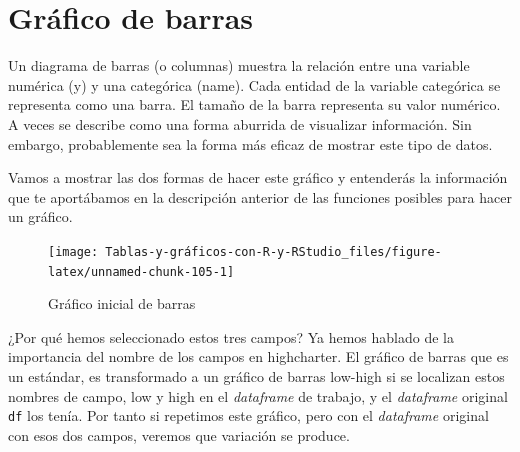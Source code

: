 \documentclass[
]{book}
\newenvironment{Shaded}{\begin{snugshade}}{\end{snugshade}}
\newcommand{\AttributeTok}[1]{\textcolor[rgb]{0.77,0.63,0.00}{#1}}
\newcommand{\CommentTok}[1]{\textcolor[rgb]{0.56,0.35,0.01}{\textit{#1}}}
\newcommand{\FunctionTok}[1]{\textcolor[rgb]{0.00,0.00,0.00}{#1}}
\newcommand{\NormalTok}[1]{#1}
\newcommand{\OtherTok}[1]{\textcolor[rgb]{0.56,0.35,0.01}{#1}}
\newcommand{\SpecialCharTok}[1]{\textcolor[rgb]{0.00,0.00,0.00}{#1}}
\newcommand{\StringTok}[1]{\textcolor[rgb]{0.31,0.60,0.02}{#1}}
\begin{document}
\hypertarget{gruxe1fico-de-barras}{%
\section{Gráfico de barras}\label{gruxe1fico-de-barras}}

Un diagrama de barras (o columnas) muestra la relación entre una variable numérica (y) y una categórica (name). Cada entidad de la variable categórica se representa como una barra. El tamaño de la barra representa su valor numérico. A veces se describe como una forma aburrida de visualizar información. Sin embargo, probablemente sea la forma más eficaz de mostrar este tipo de datos.

Vamos a mostrar las dos formas de hacer este gráfico y entenderás la información que te aportábamos en la descripción anterior de las funciones posibles para hacer un gráfico.

\begin{Shaded}
\end{Shaded}

\begin{figure}[H]

{\centering \texttt{[image: Tablas-y-gráficos-con-R-y-RStudio\_files/figure-latex/unnamed-chunk-105-1]} 

}

\caption{Gráfico inicial de barras}\label{fig:unnamed-chunk-105}
\end{figure}

¿Por qué hemos seleccionado estos tres campos? Ya hemos hablado de la importancia del nombre de los campos en highcharter. El gráfico de barras que es un estándar, es transformado a un gráfico de barras low-high si se localizan estos nombres de campo, low y high en el \emph{dataframe} de trabajo, y el \emph{dataframe} original \texttt{df} los tenía. Por tanto si repetimos este gráfico, pero con el \emph{dataframe} original con esos dos campos, veremos que variación se produce.
\end{document}
